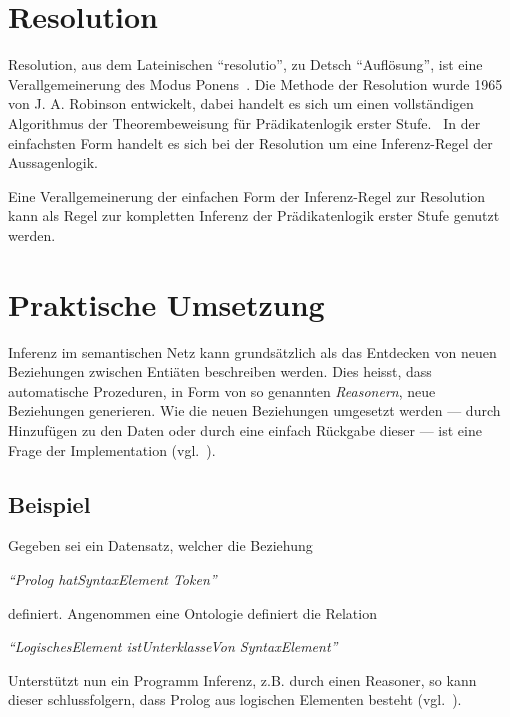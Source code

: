 \section{Resolution}
\label{sec:resolution}

Resolution, aus dem Lateinischen ``resolutio'', zu Detsch ``Auflösung'', ist eine Verallgemeinerung des Modus Ponens~\cite[S. 279]{russel}. Die Methode der Resolution wurde 1965 von J. A. Robinson entwickelt, dabei handelt es sich um einen vollständigen Algorithmus der Theorembeweisung für Prädikatenlogik erster Stufe.~\cite[S. 18]{russel} In der einfachsten Form handelt es sich bei der Resolution um eine Inferenz-Regel der Aussagenlogik.~\cite[S. 277]{russel}

Eine Verallgemeinerung der einfachen Form der Inferenz-Regel zur Resolution kann als Regel zur kompletten Inferenz der Prädikatenlogik erster Stufe genutzt werden.~\cite[S. 278]{russel}

\newpage

\section{Praktische Umsetzung}
\label{sec:inferenz_praktisch}

Inferenz im semantischen Netz kann grundsätzlich als das Entdecken von neuen Beziehungen zwischen Entiäten beschreiben werden. Dies heisst, dass automatische Prozeduren, in Form von so genannten \textit{Reasonern}, neue Beziehungen generieren. Wie die neuen Beziehungen umgesetzt werden --- durch Hinzufügen zu den Daten oder durch eine einfach Rückgabe dieser --- ist eine Frage der Implementation (vgl.~\cite[Abschnitt 1]{w3inference}).

\subsection{Beispiel}
\label{subsec:inferenz_beispiel}

Gegeben sei ein Datensatz, welcher die Beziehung

    \noindent\hspace*{12mm}\textit{``Prolog hatSyntaxElement Token''}

definiert. Angenommen eine Ontologie definiert die Relation

    \noindent\hspace*{12mm}\textit{``LogischesElement istUnterklasseVon SyntaxElement''}

Unterstützt nun ein Programm Inferenz, z.B. durch einen Reasoner, so kann dieser schlussfolgern, dass Prolog aus logischen Elementen besteht (vgl.~\cite[Abschnitt 'Examples']{w3inference}).

